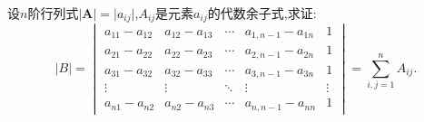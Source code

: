 \documentclass[../../main.tex]{subfiles}%
\begin{document}
\begin{example}\label{example:求矩阵代数余子式和的方法1}
设\(n\)阶行列式\(\vert \boldsymbol{A} \vert=\vert a_{ij}\vert\),\(A_{ij}\)是元素\(a_{ij}\)的代数余子式,求证:
\[
\vert B \vert = 
\begin{vmatrix}
a_{11}-a_{12} & a_{12}-a_{13} & \cdots & a_{1,n - 1}-a_{1n} & 1\\
a_{21}-a_{22} & a_{22}-a_{23} & \cdots & a_{2,n - 1}-a_{2n} & 1\\
a_{31}-a_{32} & a_{32}-a_{33} & \cdots & a_{3,n - 1}-a_{3n} & 1\\
\vdots & \vdots & \ddots & \vdots & \vdots\\
a_{n1}-a_{n2} & a_{n2}-a_{n3} & \cdots & a_{n,n - 1}-a_{nn} & 1
\end{vmatrix}
= \sum_{i,j = 1}^{n}A_{ij}.
\]
\end{example}
\end{document}
